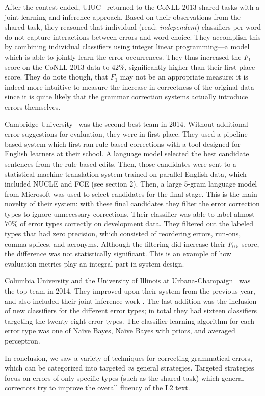 After the contest ended, UIUC~\cite{2013-joint} returned to the
CoNLL-2013 shared tasks with a joint learning and inference approach. Based on
their observations from the shared task, they reasoned that individual (read:
\emph{independent}) classifiers per word do not capture interactions between
errors and word choice. They accomplish this by combining individual classifiers
using integer linear programming---a model which is able to jointly learn the
error occurrences. They thus increased the $F_1$ score on the CoNLL-2013 data to
$42\%$, significantly higher than their first place score. They do note though,
that $F_1$ may not be an appropriate measure; it is indeed more intuitive to
measure the increase in correctness of the original data since it is quite
likely that the grammar correction systems actually introduce errors themselves.

Cambridge University~\cite{2014-hybrid}  was the second-best team in 2014.
Without additional error suggestions for evaluation, they were in first place.
They used a pipeline-based system which first ran rule-based corrections with a
tool designed for English learners at their school. A language model selected
the best candidate sentences from the rule-based edits. Then, those candidates
were sent to a statistical machine translation system trained on parallel
English data, which included NUCLE and FCE (see section 2). Then, a large 5-gram
language model from Microsoft was used to select candidates for the final stage.
This is the main novelty of their system: with these final candidates they
filter the error correction types to ignore unnecessary corrections. Their
classifier was able to label almost $70\%$ of error types correctly on
development data. They filtered out the labeled types that had zero precision,
which consisted of reordering errors, run-ons, comma splices, and acronyms.
Although the filtering did increase their $F_{0.5}$ score, the difference was not
statistically significant. This is an example of how evaluation metrics play an
integral part in system design.

Columbia University and the University of Illinois at
Urbana-Champaign~\cite{2014-cuui} was the top team in 2014. They improved upon their system from
the previous year, and also included their joint inference work
\cite{2013-joint}. The last addition was the inclusion of new classifiers for
the different error types; in total they had sixteen classifiers targeting the
twenty-eight error types. The classifier learning algorithm for each error type
was one of Na\"ive Bayes, Na\"ive Bayes with priors, and averaged perceptron.

In conclusion, we saw a variety of techniques for correcting grammatical errors,
which can be categorized into targeted \emph{vs} general strategies. Targeted
strategies focus on errors of only specific types (such as the shared task)
which general correctors try to improve the overall fluency of the L2 text.

